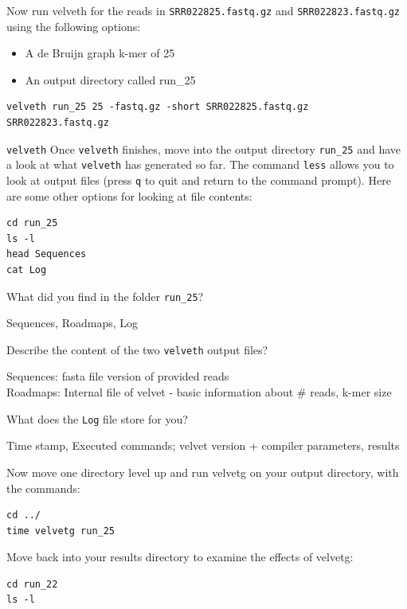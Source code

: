 \begin{steps}
Now run velveth for the reads in \texttt{SRR022825.fastq.gz} and
\texttt{SRR022823.fastq.gz} using the following options:
\begin{itemize}
  \item A de Bruijn graph k-mer of 25
  \item An output directory called run\_25
\end{itemize}
\begin{lstlisting}
velveth run_25 25 -fastq.gz -short SRR022825.fastq.gz SRR022823.fastq.gz
\end{lstlisting}

\texttt{velveth} Once \texttt{velveth} finishes, move into the output directory
\texttt{run\_25} and have a look at what \texttt{velveth} has generated so far.
The command \texttt{less} allows you to look at output files (press \texttt{q}
to quit and return to the command prompt). Here are some other options for
looking at file contents:

\begin{lstlisting}
cd run_25
ls -l
head Sequences
cat Log
\end{lstlisting}

\end{steps}

\begin{questions}
What did you find in the folder \texttt{run\_25}?
\begin{answer}
Sequences, Roadmaps, Log
\end{answer}

Describe the content of the two \texttt{velveth} output files?
\begin{answer}
Sequences: fasta file version of provided reads\\
Roadmaps: Internal file of velvet - basic information about # reads, k-mer size
\end{answer}

What does the \texttt{Log} file store for you?
\begin{answer}
Time stamp, Executed commands; velvet version + compiler parameters, results
\end{answer}
\end{questions}

\begin{steps}
Now move one directory level up and run velvetg on your output directory, with
the commands:
\begin{lstlisting}
cd ../
time velvetg run_25
\end{lstlisting}

Move back into your results directory to examine the effects of velvetg:
\begin{lstlisting}
cd run_22
ls -l
\end{lstlisting}
\end{steps}

